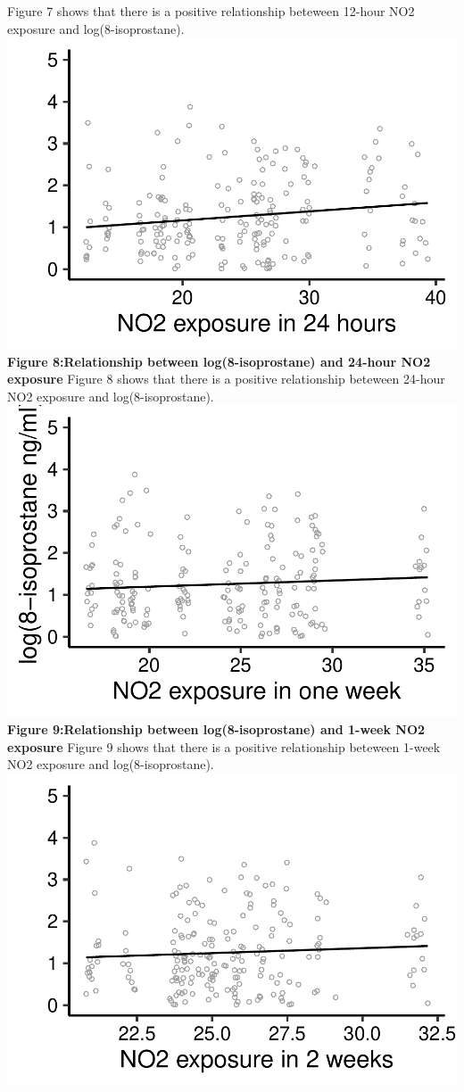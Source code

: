 \documentclass[12pt,]{article}
\begin{document}
Figure 7 shows that there is a positive relationship beteween 12-hour
NO2 exposure and log(8-isoprostane).
\includegraphics{872_files/figure-latex/unnamed-chunk-9-1.pdf}
\center \textbf{Figure 8:Relationship between log(8-isoprostane) and
24-hour NO2 exposure } \center Figure 8 shows that there is a positive
relationship beteween 24-hour NO2 exposure and log(8-isoprostane).
\includegraphics{872_files/figure-latex/unnamed-chunk-10-1.pdf}
\center \textbf{Figure 9:Relationship between log(8-isoprostane) and
1-week NO2 exposure } \center Figure 9 shows that there is a positive
relationship beteween 1-week NO2 exposure and log(8-isoprostane).
\includegraphics{872_files/figure-latex/unnamed-chunk-11-1.pdf}
\end{document}
